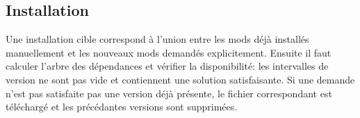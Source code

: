 \documentclass{article}
\begin{document}
\subsection{Installation}
Une installation cible correspond à l'union entre les mods déjà installés manuellement et les nouveaux mods demandés explicitement.
Ensuite il faut calculer l'arbre des dépendances et vérifier la disponibilité: les intervalles de version ne sont pas vide et contiennent une solution satisfaisante.
Si une demande n'est pas satisfaite pas une version déjà présente, le fichier correspondant est téléchargé et les précédantes versions sont supprimées.
\end{document}
